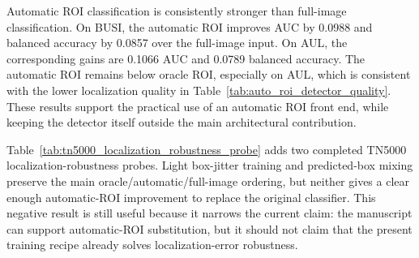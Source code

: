 \begin{table}[t]
    \centering
    \small
    \caption{Closed-loop classification with oracle ROI, automatic detector ROI, and full-image input. Values are mean $\pm$ standard deviation across five folds. Bracketed intervals are fold-bootstrap 95\% confidence intervals for AUC and balanced accuracy.}
    \label{tab:auto_roi_closed_loop}
\end{table}

Automatic ROI classification is consistently stronger than full-image classification. On BUSI, the automatic ROI improves AUC by 0.0988 and balanced accuracy by 0.0857 over the full-image input. On AUL, the corresponding gains are 0.1066 AUC and 0.0789 balanced accuracy. The automatic ROI remains below oracle ROI, especially on AUL, which is consistent with the lower localization quality in Table~\ref{tab:auto_roi_detector_quality}. These results support the practical use of an automatic ROI front end, while keeping the detector itself outside the main architectural contribution.

Table~\ref{tab:tn5000_localization_robustness_probe} adds two completed TN5000 localization-robustness probes. Light box-jitter training and predicted-box mixing preserve the main oracle/automatic/full-image ordering, but neither gives a clear enough automatic-ROI improvement to replace the original classifier. This negative result is still useful because it narrows the current claim: the manuscript can support automatic-ROI substitution, but it should not claim that the present training recipe already solves localization-error robustness.

